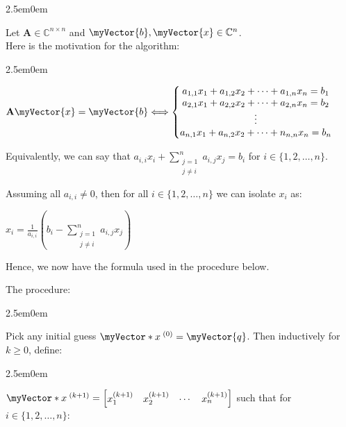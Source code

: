 \documentclass{book}
\newcommand{\hTwo}{%
   \color{MidnightBlue}%
   \fontsize{13}{15}\selectfont%
}
\newcommand{\hThree}{%
   \color{PineGreen}
   \fontsize{13}{15}\selectfont%
}
\newenvironment{myIndent}{%
   \begin{adjustwidth}{2.5em}{0em}%
}{%
   \end{adjustwidth}%
}
\newcommand{\retTwo}{\hfill\bigbreak}
\newcommand{\mVec}[1]{\myVector{#1}}
\newcommand{\mVecAst}[1]{\myVector*{#1}}
\newcommand{\mMat}[1]{\mathbf{#1}}
\begin{document}
   {\begin{myIndent} \hTwo
      Let $\mMat{A} \in \mathbb{C}^{n\times n}$ and $\mVec{b}, \mVec{x} \in \mathbb{C}^n$.\\

      Here is the motivation for the algorithm:\\
      {\begin{myIndent} \hThree
         $\mMat{A}\mVec{x} = \mVec{b} \Longleftrightarrow \left\{
         \begin{matrix}
            a_{1,1}x_1 + a_{1,2}x_2 + \cdots + a_{1,n}x_n = b_1 \\
            a_{2,1}x_1 + a_{2,2}x_2 + \cdots + a_{2,n}x_n = b_2 \\
            \vdots \\
            a_{n,1}x_1 + a_{n,2}x_2 + \cdots + n_{n,n}x_n = b_n \\
         \end{matrix}\right.$\retTwo

         Equivalently, we can say that $a_{i,i}x_i + {\displaystyle \sum_{
         \begin{smallmatrix}
            j = 1 \\
            j \neq i
         \end{smallmatrix}}^n{a_{i,j}x_j}} = b_i$ for $i \in \{1, 2, \ldots, n\}$. \retTwo

         Assuming all $a_{i,i} \neq 0$, then for all $i \in \{1, 2, \ldots, n\}$ we can isolate $x_i$ as:

         {\centering $ x_i = \frac{1}{a_{i,i}}(b_i - {\displaystyle \sum_{
            \begin{smallmatrix}
               j = 1 \\
               j \neq i
            \end{smallmatrix}}^n{a_{i,j}x_j}})$\retTwo\par}

         Hence, we now have the formula used in the procedure below.
      \end{myIndent}}
      \retTwo

      The procedure:
      {\begin{myIndent} \hThree
         Pick any initial guess $\mVecAst{x}^{\phantom{.}(0)} = \mVec{q}$.  Then inductively for $k \geq 0$, define:
         \begin{myIndent}
            $\mVecAst{x}^{\phantom{.}(k+1)} = 
            \begin{bmatrix}
               x_1^{(k+1)} & x_2^{(k+1)} & \cdots & x_n^{(k+1)}
            \end{bmatrix}$ such that for $i \in \{1, 2, \ldots, n\}$:\\


\end{myIndent}
\end{myIndent}}
\end{myIndent}}
\end{document}
